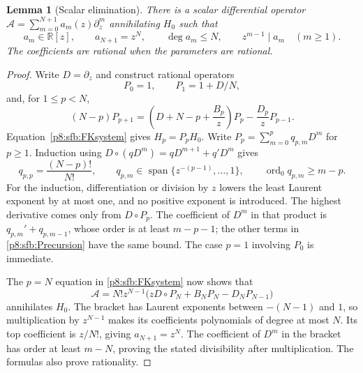 \documentclass[11pt,a4paper]{article}
\newtheorem{lemma}[theorem]{Lemma}
\theoremstyle{definition}
\theoremstyle{remark}
\numberwithin{equation}{section}
\begin{document}
\begin{lemma}[Scalar elimination]\label{p8:sfb:elimination}
There is a scalar differential operator
$\mathcal A=\sum_{m=0}^{N+1}a_m(z)\partial_z^m$ annihilating $H_0$ such that
\[
 a_m\in\mathbb R[z],\qquad a_{N+1}=z^N,\qquad
 \deg a_m\le N,\qquad z^{m-1}\mid a_m\quad(m\ge1).
\]
The coefficients are rational when the parameters are rational.
\end{lemma}
\begin{proof}
Write $D=\partial_z$ and construct rational operators
\[
 P_0=1,\qquad P_1=1+D/N,
\]
and, for $1\le p<N$,
\begin{equation}\label{p8:sfb:Precursion}
 (N-p)P_{p+1}=
 \left(D+N-p+\frac{B_p}{z}\right)P_p
       -\frac{D_p}{z}P_{p-1}.
\end{equation}
Equation~\eqref{p8:sfb:FKsystem} gives $H_p=P_pH_0$.
Write $P_p=\sum_{m=0}^pq_{p,m}D^m$ for $p\ge1$.
Induction using $D\circ(qD^m)=qD^{m+1}+q'D^m$ gives
\[
 q_{p,p}=\frac{(N-p)!}{N!},\qquad
 q_{p,m}\in\operatorname{span}\{z^{-(p-1)},\ldots,1\},
 \qquad \operatorname{ord}_0q_{p,m}\ge m-p.
\]
For the induction, differentiation or division by $z$ lowers
the least Laurent exponent by at most one, and no positive
exponent is introduced.  The highest derivative comes only
from $D\circ P_p$.  The coefficient of $D^m$ in that product
is $q_{p,m}'+q_{p,m-1}$, whose order is at least $m-p-1$;
the other terms in \eqref{p8:sfb:Precursion} have the same bound.
The case $p=1$ involving $P_0$ is immediate.

The $p=N$ equation in \eqref{p8:sfb:FKsystem} now shows that
\begin{equation}\label{p8:sfb:Aoperator}
 \mathcal A=N!z^{N-1}
       \bigl(zD\circ P_N+B_NP_N-D_NP_{N-1}\bigr)
\end{equation}
annihilates $H_0$.  The bracket has Laurent exponents between
$-(N-1)$ and $1$, so multiplication by $z^{N-1}$ makes its
coefficients polynomials of degree at most $N$.
Its top coefficient is $z/N!$, giving $a_{N+1}=z^N$.
The coefficient of $D^m$ in the bracket has order at least
$m-N$, proving the stated divisibility after multiplication.
The formulas also prove rationality.
\end{proof}
\end{document}
